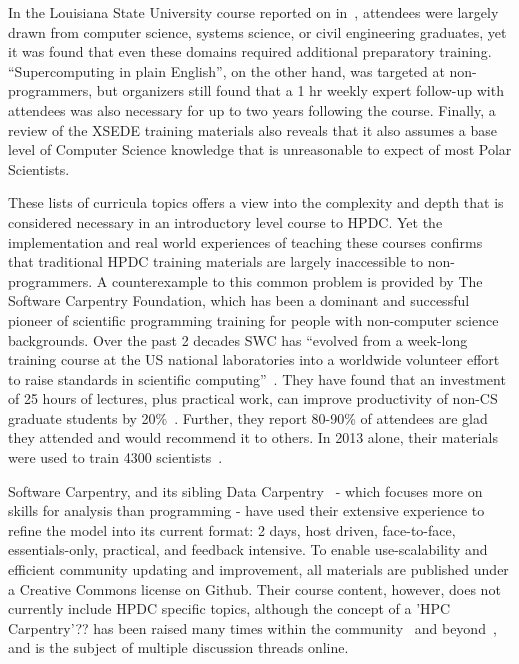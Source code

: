 \documentclass[conference]{IEEEtran}
\begin{document}
In the Louisiana State University course reported on in~\cite{Allen2011-qx}, attendees were largely drawn from computer science, systems science, or civil engineering graduates, yet it was found that even these domains required additional preparatory training. ``Supercomputing in plain English'', on the other hand, was targeted at non-programmers, but organizers still found that a 1 hr weekly expert follow-up with attendees was also necessary for up to two years following the course.  Finally, a review of the XSEDE training materials also reveals that it also assumes a base level of Computer Science knowledge that is unreasonable to expect of most Polar Scientists.

These lists of curricula topics offers a view into the complexity and depth that is considered necessary in an introductory level course to HPDC. Yet the implementation and real world experiences of teaching these courses confirms that traditional HPDC training materials are largely inaccessible to non-programmers. A counterexample to this common problem is provided by The Software Carpentry Foundation, which has been a dominant and successful pioneer of scientific programming training for people with non-computer science backgrounds. Over the past 2 decades SWC has ``evolved from a week-long training course at the US national laboratories into a worldwide volunteer effort to raise standards in scientific computing''~\cite{Wilson2014-pc}. They have found that an investment of 25 hours of lectures, plus practical work, can improve productivity of non-CS graduate students by 20\%~\cite{Wilson_undated-yk}. Further, they report 80-90\% of attendees are glad they attended and would recommend it to others. In 2013 alone, their materials were used to train 4300 scientists~\cite{Wilson2014-pc}.

Software Carpentry, and its sibling Data Carpentry~\cite{Mimno2016-cw} - which focuses more on skills for analysis than programming - have used their extensive experience to refine the model into its current format: 2 days, host driven, face-to-face, essentials-only, practical, and feedback intensive. To enable use-scalability and efficient community updating and improvement, all materials are published under a Creative Commons license on Github. Their course content, however, does not currently include HPDC specific topics, although the concept of a 'HPC Carpentry'?? has been raised many times within the community~\cite{Datacarpentry_undated-zl} and beyond~\cite{noauthor_undated-zw}, and is the subject of multiple discussion threads online. 
\end{document}
